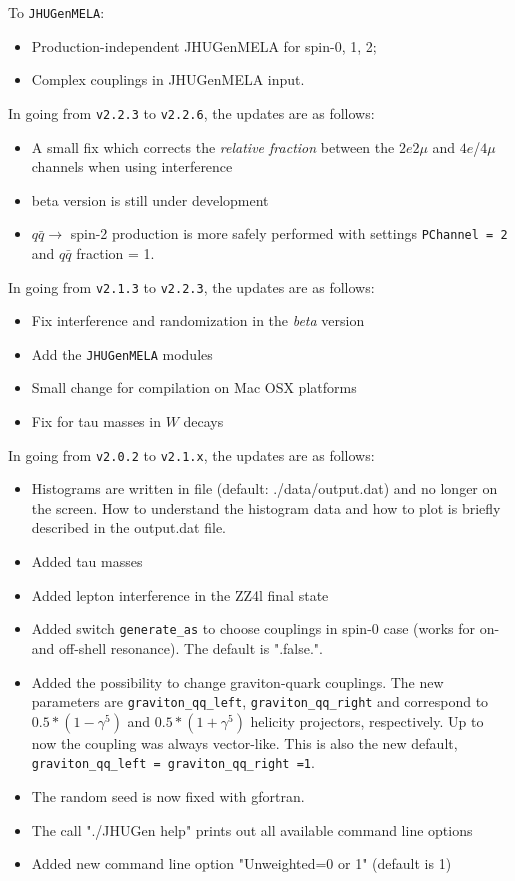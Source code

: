 \documentclass[aps,superscriptaddress,nofootinbib]{revtex4}
\begin{document}
To \verb|JHUGenMELA|:
\begin{itemize}
\item Production-independent JHUGenMELA for spin-0, 1, 2;
\item Complex couplings in JHUGenMELA input.
\end{itemize}

\noindent
In going from \verb|v2.2.3| to \verb|v2.2.6|, the updates are as follows:
\begin{itemize}
\item A small fix which corrects the {\it relative fraction} between the $2e2\mu$ and $4e$/$4\mu$ channels when using interference
\item beta version is still under development
\item $q\bar{q} \to$ spin-2 production is more safely performed with settings \verb|PChannel = 2| and $q\bar{q}$ fraction = 1.
\end{itemize}

\noindent
In going from \verb|v2.1.3| to \verb|v2.2.3|, the updates are as follows:
\begin{itemize}
\item Fix interference and randomization in the {\it{beta}} version
\item Add the \verb|JHUGenMELA| modules
\item Small change for compilation on Mac OSX platforms
\item Fix for tau masses in $W$ decays
\end{itemize}

\noindent
In going from \verb|v2.0.2| to \verb|v2.1.x|, the updates are as follows:

\begin{itemize}
\item Histograms are written in file (default: ./data/output.dat) and no longer on the screen.  How to understand the histogram data and how to plot is briefly described in the output.dat file.
\item Added tau masses
\item Added lepton interference in the ZZ4l final state
\item Added switch \verb|generate_as| to choose couplings in spin-0 case (works for on- and off-shell resonance). The default is ".false.".
\item Added the possibility to change graviton-quark couplings. The new parameters are \verb|graviton_qq_left|, \verb|graviton_qq_right| and correspond to $0.5*(1-\gamma^5)$ and $0.5*(1+\gamma^5)$ helicity projectors, respectively. Up to now the coupling was always vector-like. This is also the new default, \verb|graviton_qq_left = graviton_qq_right =1|.
\item The random seed is now fixed with gfortran.
\item The call "./JHUGen help" prints out all available command line options
\item Added new command line option "Unweighted=0 or 1" (default is 1)
\end{itemize}
\end{document}
